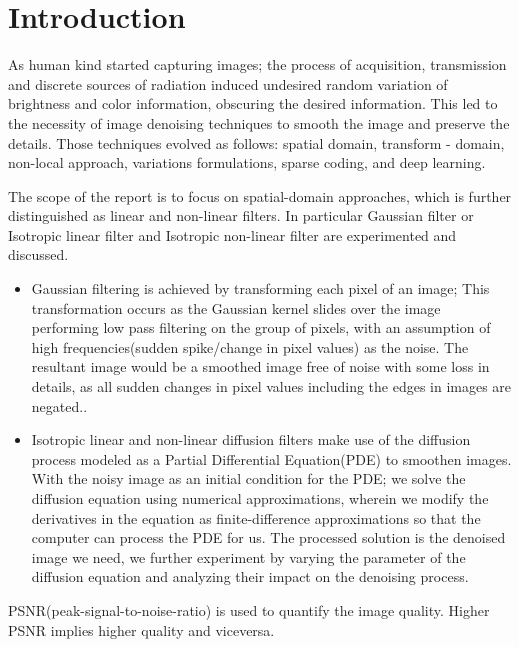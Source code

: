 \documentclass{ipol}
\begin{document}


\section{Introduction}

As human kind started capturing images; the process of acquisition, transmission and discrete sources of radiation induced undesired random variation of brightness and color information, obscuring the desired information. This led to the necessity of image denoising techniques to smooth the image and preserve the details. Those techniques evolved as follows: spatial domain, transform - domain, non-local approach, variations formulations, sparse coding, and deep learning\cite{Zhang2015}.

The scope of the report is to focus on spatial-domain approaches, which is further distinguished as linear and non-linear filters\cite{hore2010image}. In particular Gaussian filter or Isotropic linear filter and Isotropic non-linear filter are experimented and discussed.
\begin{itemize}
\item
Gaussian filtering is achieved by transforming each pixel of an image; This transformation occurs as the Gaussian kernel slides over the image performing low pass filtering on the group of pixels, with an assumption of high frequencies(sudden spike/change in pixel values) as the noise. The resultant image would be a smoothed image free of noise with some loss in details, as all sudden changes in pixel values including the edges in images are negated.\cite{Zhang2015}.
\item
Isotropic linear and non-linear diffusion filters make use of the diffusion process modeled as a Partial Differential Equation(PDE) to smoothen images. With the noisy image as an initial condition for the PDE; we solve the diffusion equation using numerical approximations, wherein we modify the derivatives in the equation as finite-difference approximations\cite{LeVeque2007FiniteDM} so that the computer can process the PDE for us. The processed solution is the denoised image we need, we further experiment by varying the parameter of the diffusion equation and analyzing their impact on the denoising process.
\end{itemize}
PSNR(peak-signal-to-noise-ratio) is used to quantify the image quality. Higher PSNR implies higher quality and viceversa\cite{hore2010image}.
\end{document}
